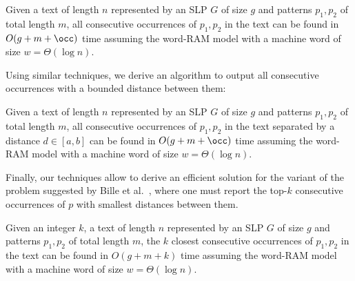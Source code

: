 \begin{theorem}\label{th:main}
Given a text of length $n$ represented by an SLP $G$ of size $g$ and patterns $p_1,p_2$ of total length $m$, all consecutive occurrences of $p_1,p_2$ in the text can be found in $O(g+m+\occ)$ time assuming the word-RAM model with a machine word of size $w = \Theta(\log n)$. 
\end{theorem}

Using similar techniques, we derive an algorithm to output all consecutive occurrences with a bounded distance between them:

\begin{corollary}\label{cor:ab}
Given a text of length $n$ represented by an SLP $G$ of size $g$ and patterns $p_1,p_2$ of total length $m$, all consecutive occurrences of $p_1,p_2$ in the text separated by a distance $d \in [a,b]$ can be found in $O(g+m+\occ)$ time assuming the word-RAM model with a machine word of size $w = \Theta(\log n)$. 
\end{corollary}

Finally, our techniques allow to derive an efficient solution for 
the variant of the problem suggested by Bille et al.~\cite{DBLP:conf/fsttcs/BilleGPRS20}, where one must report the top-$k$ consecutive occurrences of $p$ with smallest distances between them. 

\begin{corollary}\label{cor:topk}
Given an integer $k$, a text of length $n$ represented by an SLP $G$ of size $g$ and patterns $p_1,p_2$ of total length $m$, the $k$ closest consecutive occurrences of $p_1,p_2$ in the text can be found in $O(g+m+k)$ time assuming the word-RAM model with a machine word of size $w = \Theta(\log n)$. 
\end{corollary}